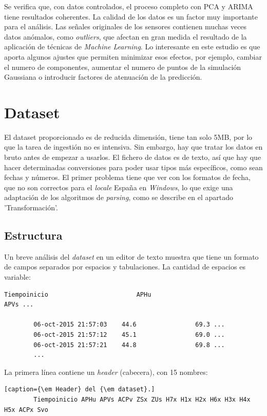 \documentclass[11pt,spanish,listoffigures,listoftables]{tfgetsinf}
\begin{document}
    Se verifica que, con datos controlados, el proceso completo con PCA y ARIMA tiene resultados coherentes. La calidad de los datos es un factor muy importante para el análisis. Las señales originales de los sensores contienen muchas veces datos anómalos, como {\em outliers}, que afectan en gran medida el resultado de la aplicación de técnicas de {\em Machine Learning}. Lo interesante en este estudio es que aporta algunos ajustes que permiten minimizar esos efectos, por ejemplo, cambiar el numero de componentes, aumentar el numero de puntos de la simulación Gaussiana o introducir factores de atenuación de la predicción.
    

    \section{Dataset}
    El dataset proporcionado es de reducida dimensión, tiene tan solo 5MB, por lo que la tarea de ingestión no es intensiva. Sin embargo, hay que tratar los datos en bruto antes de empezar a usarlos. El fichero de datos es de texto, así que hay que hacer determinadas conversiones para poder usar tipos más específicos, como sean fechas y números. El primer problema tiene que ver con los formatos de fecha, que no son correctos para el {\em locale} España en {\em Windows}, lo que exige una adaptación de los algoritmos de {\em parsing}, como se describe en el apartado 'Transformación'.
    
        \subsection{Estructura}
        Un breve análisis del {\em dataset} en un editor de texto muestra que tiene un formato de campos separados por espacios y tabulaciones. La cantidad de espacios es variable:
    
        \lstset{style=default}
        \lstset{
          showspaces = true
        }
        \begin{lstlisting}[caption=Ejemplo del {\em dataset}.]
        Tiempoinicio                    	APHu                            	APVs ...
        
        06-oct-2015 21:57:03 	44.6             	69.3 ...
        06-oct-2015 21:57:12 	45.1             	69.0 ...
        06-oct-2015 21:57:21 	44.8             	69.8 ...
        ...
        \end{lstlisting}
        
        \lstset{
          showspaces = false
        }
        La primera línea contiene un {\em header} (cabecera), con 15 nombres: 
        \begin{lstlisting}[caption={\em Header} del {\em dataset}.]
        Tiempoinicio APHu APVs ACPv ZSx ZUs H7x H1x H2x H6x H3x H4x H5x ACPx Svo
        \end{lstlisting}
        
\end{document}
